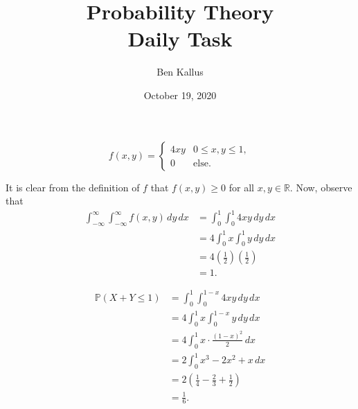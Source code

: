 \documentclass[12pt]{article}
\title{Probability Theory \\ Daily Task}
\author{Ben Kallus}
\date{October 19, 2020}
\begin{document}
\maketitle

$$f(x,y)=\begin{cases} 4xy & 0 \leq x,y \leq 1, \\ 0 & \text{else.} \end{cases}$$


    It is clear from the definition of $f$ that $f(x,y) \geq 0$ for all $x, y \in \mathbb R$. Now, observe that
    \begin{align*}
        \int_{-\infty}^\infty\int_{-\infty}^\infty f(x,y)\,dy\,dx &= \int_{0}^1\int_{0}^1 4xy\,dy\,dx \\
                                                                  &= 4\int_{0}^1 x\int_{0}^1 y\,dy\,dx \\
                                                                  &= 4\left(\frac{1}{2}\right) \left(\frac{1}{2}\right) \\
                                                                  &= 1.
    \end{align*}
    
\newpage
{}
\begin{align*}
    \mathbb P(X+Y\leq 1) &= \int_0^1 \int_0^{1-x} 4xy\,dy\,dx \\
                         &= 4\int_0^1 x \int_0^{1-x} y\,dy\,dx \\
                         &= 4\int_0^1 x \cdot \frac{(1-x)^2}{2}\,dx \\
                         &= 2\int_0^1 x^3 - 2x^2 + x \, dx \\
                         &= 2\left(\frac14 - \frac23 + \frac12\right) \\
                         &= \frac16.
\end{align*}
\end{document}

